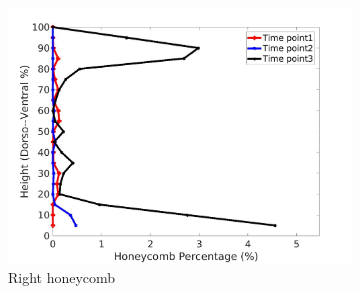 \begin{figure}[H]
\begin{subfigure}{.42\linewidth}
  \includegraphics[width=\linewidth,trim={{.0\wd0} {.0\wd0} {.0\wd0} {.0\wd0}},clip]{Appendix/Image_AppexA/DorsoToVentral/IPF15RightLungHoneycombDiseaseDorsoToVentral.jpg}
  \caption{Right honeycomb}
  \label{fig:IPF15DiseaseDorsoToVentral-f}
\end{subfigure}
\begin{subfigure}{.42\linewidth}%

\end{subfigure}
\end{figure}
